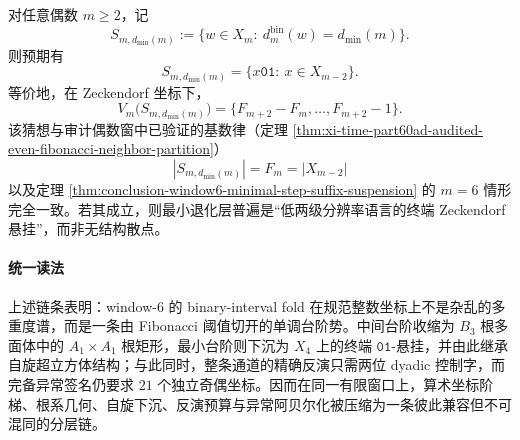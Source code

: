 \begin{conjecture}[偶数窗最小台阶的终端悬挂]\label{conj:conclusion-even-window-minimal-step-terminal-suspension}
对任意偶数 \(m\ge 2\)，记
\[
S_{m,d_{\min}(m)}:=\{w\in X_m:\ d_m^{\mathrm{bin}}(w)=d_{\min}(m)\}.
\]
则预期有
\[
S_{m,d_{\min}(m)}
=
\{x\mathtt{01}:\ x\in X_{m-2}\}.
\]
等价地，在 Zeckendorf 坐标下，
\[
V_m\bigl(S_{m,d_{\min}(m)}\bigr)
=
\{F_{m+2}-F_m,\dots,F_{m+2}-1\}.
\]
该猜想与审计偶数窗中已验证的基数律（定理 \ref{thm:xi-time-part60ad-audited-even-fibonacci-neighbor-partition}）
\[
|S_{m,d_{\min}(m)}|=F_m=|X_{m-2}|
\]
以及定理 \ref{thm:conclusion-window6-minimal-step-suffix-suspension} 的 \(m=6\) 情形完全一致。若其成立，则最小退化层普遍是“低两级分辨率语言的终端 Zeckendorf 悬挂”，而非无结构散点。
\end{conjecture}

\paragraph{统一读法}
上述链条表明：window-\(6\) 的 binary-interval fold 在规范整数坐标上不是杂乱的多重度谱，而是一条由 Fibonacci 阈值切开的单调台阶势。中间台阶收缩为 \(B_3\) 根多面体中的 \(A_1\times A_1\) 根矩形，最小台阶则下沉为 \(X_4\) 上的终端 \(\mathtt{01}\)-悬挂，并由此继承自旋超立方体结构；与此同时，整条通道的精确反演只需两位 dyadic 控制字，而完备异常签名仍要求 \(21\) 个独立奇偶坐标。因而在同一有限窗口上，算术坐标阶梯、根系几何、自旋下沉、反演预算与异常阿贝尔化被压缩为一条彼此兼容但不可混同的分层链。

\endinput
